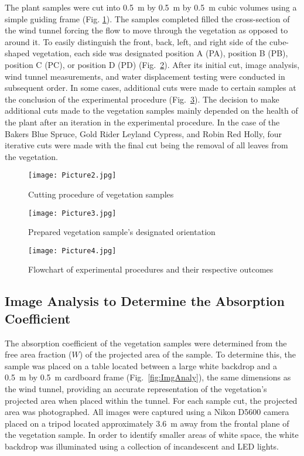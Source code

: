 \documentclass[12pt]{article}
\begin{document}
The plant samples were cut into 0.5~m by 0.5~m by 0.5~m cubic volumes using a simple guiding frame (Fig. \ref{fig:Sampleprep}). The samples completed filled the cross-section of the wind tunnel forcing the flow to move through the vegetation as opposed to around it. To easily distinguish the front, back, left, and right side of the cube-shaped vegetation, each side was designated position A (PA), position B (PB), position C (PC), or position D (PD) (Fig.~\ref{fig:Vegpos}). After its initial cut, image analysis, wind tunnel measurements, and water displacement testing were conducted in subsequent order. In some cases, additional cuts were made to certain samples at the conclusion of the experimental procedure (Fig.~\ref{fig:flowchart}). The decision to make additional cuts made to the vegetation samples mainly depended on the health of the plant after an iteration in the experimental procedure. In the case of the Bakers Blue Spruce, Gold Rider Leyland Cypress, and Robin Red Holly, four iterative cuts were made with the final cut being the removal of all leaves from the vegetation.

\begin{figure} [h]
	\centering 	\texttt{[image: Picture2.jpg]}
	\caption{Cutting procedure of vegetation samples}
	\label{fig:Sampleprep}
\end{figure}

\begin{figure} [!]
	\centering 	\texttt{[image: Picture3.jpg]}
	\caption{Prepared vegetation sample's designated orientation}
	\label{fig:Vegpos}
\end{figure}

\begin{figure} [!]
	\centering 	\texttt{[image: Picture4.jpg]}
	\caption{Flowchart of experimental procedures and their respective outcomes}
	\label{fig:flowchart}
\end{figure}



\subsection{Image Analysis to Determine the Absorption Coefficient }
\label{ssec:headingscap}

The absorption coefficient of the vegetation samples were determined from the free area fraction ($W$) of the projected area of the sample. To determine this, the sample was placed on a table located between a large white backdrop and a 0.5~m by 0.5~m cardboard frame (Fig.~\ref{fig:ImgAnaly}), the same dimensions as the wind tunnel, providing an accurate representation of the vegetation's projected area when placed within the tunnel. For each sample cut, the projected area was photographed. All images were captured using a Nikon D5600 camera placed on a tripod located approximately 3.6~m away from the frontal plane of the vegetation sample. In order to identify smaller areas of white space, the white backdrop was illuminated using a collection of incandescent and LED lights.
\end{document}
